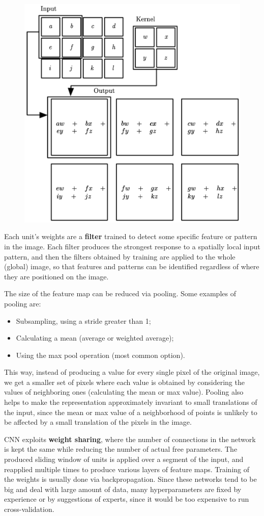 \begin{figure}[h]
    \centering
    \includegraphics[width=0.5\linewidth]{img/CNN_matrix.png}
\end{figure}
Each unit's weights are a \textbf{filter} trained to detect some specific feature or pattern in the image. Each filter produces the strongest response to a spatially local input pattern, and then the filters obtained by training are applied to the whole (global) image, so that features and patterns can be identified regardless of where they are positioned on the image.

The size of the feature map can be reduced via pooling. Some examples of pooling are:
\begin{itemize}
    \item Subsampling, using a stride greater than 1;
    \item Calculating a mean (average or weighted average);
    \item Using the max pool operation (most common option).
\end{itemize}
This way, instead of producing a value for every single pixel of the original image, we get a smaller set of pixels where each value is obtained by considering the values of neighboring ones (calculating the mean or max value). Pooling also helps to make the representation approximately invariant to small translations of the input, since the mean or max value of a neighborhood of points is unlikely to be affected by a small translation of the pixels in the image.

CNN exploits \textbf{weight sharing}, where the number of connections in the network is kept the same while reducing the number of actual free parameters. The produced sliding window of units is applied over a segment of the input, and reapplied multiple times to produce various layers of feature maps. Training of the weights is usually done via backpropagation. Since these networks tend to be big and deal with large amount of data, many hyperparameters are fixed by experience or by suggestions of experts, since it would be too expensive to run cross-validation.

